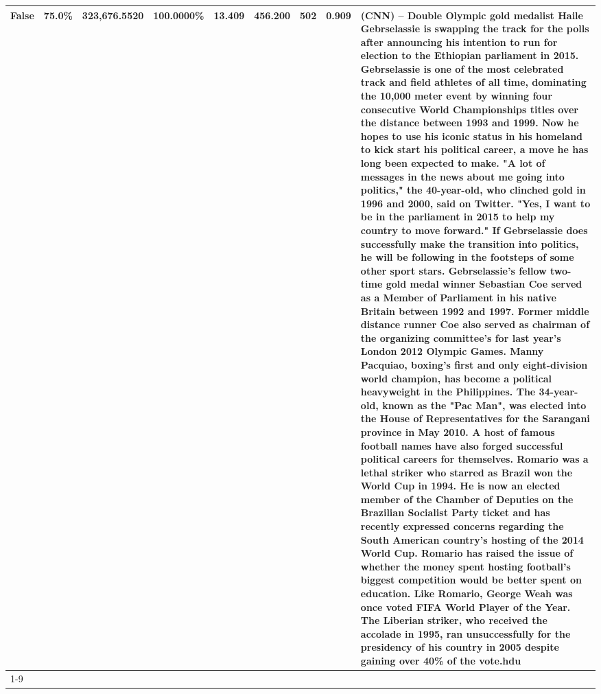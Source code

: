 \begin{table}[H]
{\begin{tabular}{lllrlllll}
False & 75.0\% & 323,676.5520 & \bfseries \color{red} 100.0000\% & 13.409 & 456.200 & 502 & 0.909 & (CNN) -- Double Olympic gold medalist Haile Gebrselassie is swapping the track for the polls after announcing his intention to run for election to the Ethiopian parliament in 2015. Gebrselassie is one of the most celebrated track and field athletes of all time, dominating the 10,000 meter event by winning four consecutive World Championships titles over the distance between 1993 and 1999. Now he hopes to use his iconic status in his homeland to kick start his political career, a move he has long been expected to make. "A lot of messages in the news about me going into politics," the 40-year-old, who clinched gold in 1996 and 2000, said on Twitter. "Yes, I want to be in the parliament in 2015 to help my country to move forward." If Gebrselassie does successfully make the transition into politics, he will be following in the footsteps of some other sport stars. Gebrselassie's fellow two-time gold medal winner Sebastian Coe served as a Member of Parliament in his native Britain between 1992 and 1997. Former middle distance runner Coe also served as chairman of the organizing committee's for last year's London 2012 Olympic Games. Manny Pacquiao, boxing's first and only eight-division world champion, has become a political heavyweight in the Philippines. The 34-year-old, known as the "Pac Man", was elected into the House of Representatives for the Sarangani province in May 2010. A host of famous football names have also forged successful political careers for themselves. Romario was a lethal striker who starred as Brazil won the World Cup in 1994. He is now an elected member of the Chamber of Deputies on the Brazilian Socialist Party ticket and has recently expressed concerns regarding the South American country's hosting of the 2014 World Cup. Romario has raised the issue of whether the money spent hosting football's biggest competition would be better spent on education. Like Romario, George Weah was once voted FIFA World Player of the Year. The Liberian striker, who received the accolade in 1995, ran unsuccessfully for the presidency of his country in 2005 despite gaining over 40\% of the vote.hdu \\
\cline{1-9}

\end{tabular}}
\end{table}
